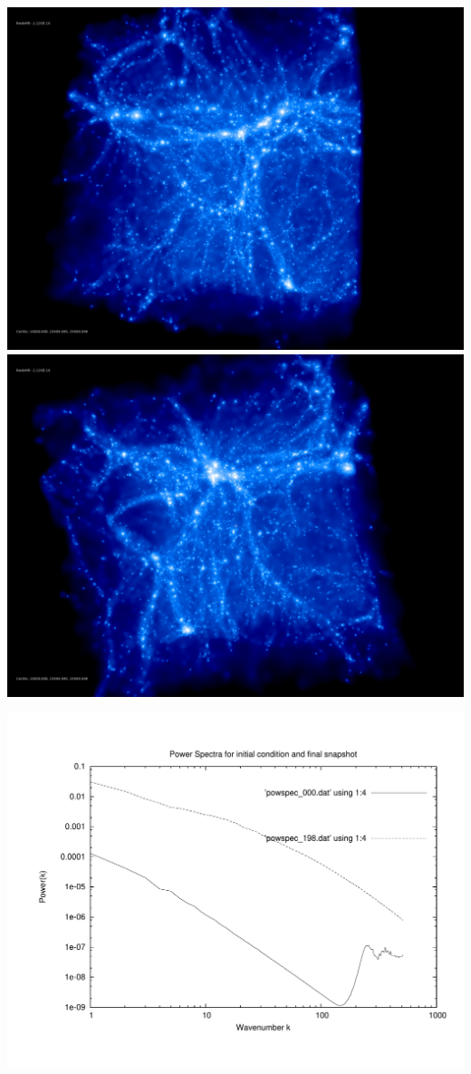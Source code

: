 \includegraphics[scale=0.1]{stages_12/rotate_00074.jpg} 
\includegraphics[scale=0.1]{stages_12/rotate_00131.jpg}

\includegraphics[scale=0.5]{stages_12/plot_powspec_stages_12}

